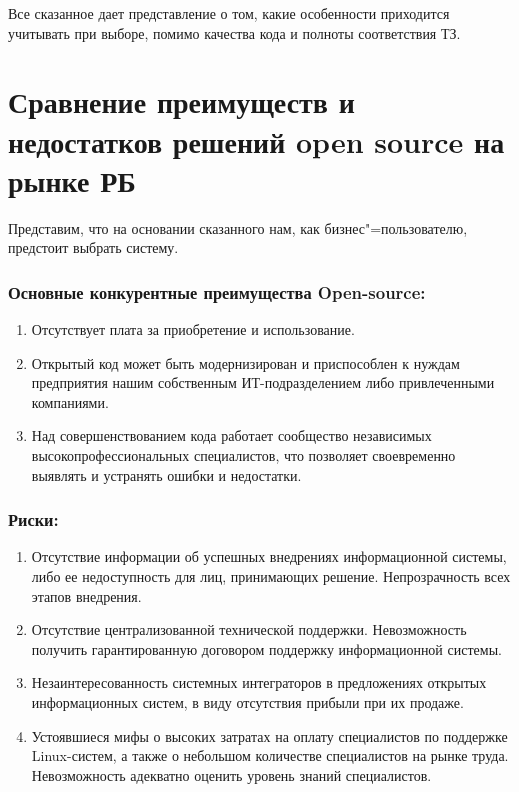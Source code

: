 \documentclass[10pt, a5paper]{article}
\begin{document}
Все сказанное дает представление о том, какие особенности приходится учитывать при выборе, помимо качества кода и полноты соответствия ТЗ.

\section*{Сравнение преимуществ и недостатков решений open source на рынке РБ}

Представим, что на основании сказанного нам, как бизнес"=пользователю,  предстоит выбрать систему.

\subsubsection*{Основные конкурентные преимущества Open-source:}

\begin{enumerate}
  \item Отсутствует плата за приобретение и использование.
  \item Открытый код может быть модернизирован и приспособлен к нуждам предприятия нашим собственным ИТ-подразделением либо привлеченными компаниями.
  \item Над совершенствованием кода работает сообщество независимых высокопрофессиональных специалистов, что позволяет своевременно выявлять и устранять ошибки и недостатки.
\end{enumerate}

\subsubsection*{Риски:}

\begin{enumerate}
  \item Отсутствие информации об успешных внедрениях информационной системы, либо ее недоступность для лиц, принимающих решение. Непрозрачность всех этапов внедрения.
  \item Отсутствие централизованной технической поддержки. Невозможность получить гарантированную договором поддержку информационной системы.
  \item Незаинтересованность системных интеграторов в предложениях открытых информационных систем, в виду отсутствия прибыли при их продаже.
  \item Устоявшиеся мифы о высоких затратах на оплату специалистов по поддержке Linux-систем, а также о небольшом количестве специалистов на рынке труда. Невозможность адекватно оценить уровень знаний специалистов.
\end{enumerate}
\end{document}
